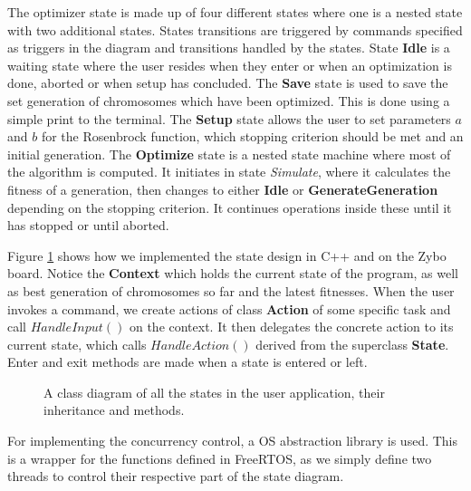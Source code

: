 The optimizer state is made up of four different states where one is a nested state with two additional states.
States transitions are triggered by commands specified as triggers in the diagram and transitions handled by the states. State \textbf{Idle} is a waiting state where the user resides when they enter or when an optimization is done, aborted or when setup has concluded. The \textbf{Save} state is used to save the set generation of chromosomes which have been optimized. This is done using a simple print to the terminal. The \textbf{Setup} state allows the user to set parameters $a$ and $b$ for the Rosenbrock function, which stopping criterion should be met and an initial generation. The \textbf{Optimize} state is a nested state machine where most of the algorithm is computed. It initiates in state \emph{Simulate}, where it calculates the fitness of a generation, then changes to either \textbf{Idle} or \textbf{GenerateGeneration} depending on the stopping criterion. It continues operations inside these until it has stopped or until aborted.

Figure \ref{fig:classdiagram} shows how we implemented the state design in C++ and on the Zybo board. Notice the \textbf{Context} which holds the current state of the program, as well as best generation of chromosomes so far and the latest fitnesses. When the user invokes a command, we create actions of class \textbf{Action} of some specific task and call $HandleInput()$ on the context. It then delegates the concrete action to its current state, which calls $HandleAction()$ derived from the superclass \textbf{State}. Enter and exit methods are made when a state is entered or left.

\begin{figure}[h!]
	\centering
	\caption{A class diagram of all the states in the user application, their inheritance and methods.}
	\label{fig:classdiagram}
\end{figure}

For implementing the concurrency control, a OS abstraction library is used. This is a wrapper for the functions defined in FreeRTOS, as we simply define two threads to control their respective part of the state diagram.


